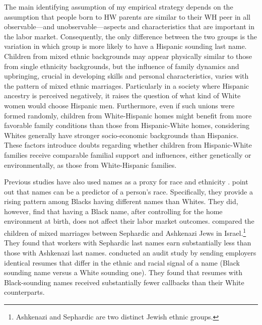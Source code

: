The main identifying assumption of my empirical strategy depends on the assumption that people born to HW parents are similar to their WH peer in all observable---and unobservable---aspects and characteristics that are important in the labor market. Consequently, the only difference between the two groups is the variation in which group is more likely to have a Hispanic sounding last name. Children from mixed ethnic backgrounds may appear physically similar to those from single ethnicity backgrounds, but the influence of family dynamics and upbringing, crucial in developing skills and personal characteristics, varies with the pattern of mixed ethnic marriages. Particularly in a society where Hispanic ancestry is perceived negatively, it raises the question of what kind of White women would choose Hispanic men. Furthermore, even if such unions were formed randomly, children from White-Hispanic homes might benefit from more favorable family conditions than those from Hispanic-White homes, considering Whites generally have stronger socio-economic backgrounds than Hispanics. These factors introduce doubts regarding whether children from Hispanic-White families receive comparable familial support and influences, either genetically or environmentally, as those from White-Hispanic families.

Previous studies have also used names as a proxy for race and ethnicity \autocite{fryer2004causes, rubinstein2014pride, bertrand2004emily}. \textcite{fryer2004causes} point out that names can be a predictor of a person's race. Specifically, they provide a rising pattern among Blacks having different names than Whites. They did, however, find that having a Black name, after controlling for the home environment at birth, does not affect their labor market outcomes. \textcite{rubinstein2014pride} compared the children of mixed marriages between Sephardic and Ashkenazi Jews in Israel.\footnote{Ashkenazi and Sephardic are two distinct Jewish ethnic groups.} They found that workers with Sephardic last names earn substantially less than those with Ashkenazi last names. \textcite{bertrand2004emily} conducted an audit study by sending employers identical resumes that differ in the ethnic and racial signal of a name (Black sounding name versus a White sounding one). They found that resumes with Black-sounding names received substantially fewer callbacks than their White counterparts. 

